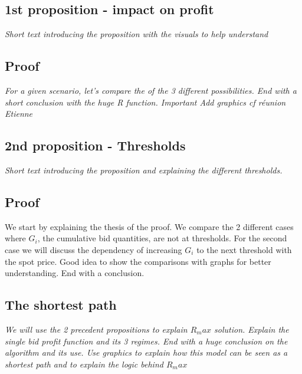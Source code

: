 \documentclass[a4paper,11pt]{article}
\begin{document}
\subsection{1st proposition - impact on profit}
\textit{Short text introducing the proposition with the visuals to help understand }
\subsection{Proof}
\textit{For a given scenario, let's compare the of the 3 different possibilities. End with a short conclusion with the huge R function. Important Add graphics cf réunion Etienne}
\subsection{2nd proposition - Thresholds}
\textit{Short text introducing the proposition and explaining the different thresholds.}
\subsection{Proof}
We start by explaining the thesis of the proof. We compare the 2 different cases where $G_i$, the cumulative bid quantities, are not at thresholds.
For the second case we will discuss the dependency of increasing $G_i$ to the next threshold with the spot price. Good idea to show the comparisons with graphs for better understanding. End with a conclusion.

\subsection{The shortest path}
\textit{We will use the 2 precedent propositions to explain $R_max$ solution. Explain the single bid profit function and its 3 regimes. End with a huge conclusion on the algorithm and its use. Use graphics to explain how this model can be seen as a shortest path and to explain the logic behind $R_max$}
\end{document}
